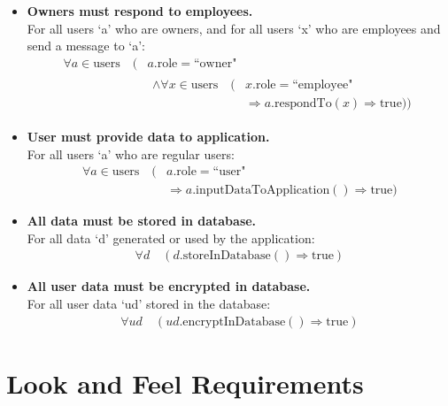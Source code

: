 \documentclass[12pt]{article}
\begin{document}
\begin{itemize}
    \item \textbf{Owners must respond to employees.}\\
    For all users `a' who are owners, and for all users `x' who are employees and send a message to `a':
    \[
    \begin{split}
        \forall a \in \text{users} \quad (& a.\text{role} = \text{``owner"} \\
        & \begin{split} 
            \land \forall x \in \text{users} \quad (& x.\text{role} = \text{``employee"}\\
            & \Rightarrow a.\text{respondTo}(x) \Rightarrow \text{true}))
        \end{split}
    \end{split}
    \]
    
    \item \textbf{User must provide data to application.}\\
    For all users `a' who are regular users:
    \[
    \begin{split}
        \forall a \in \text{users} \quad (& a.\text{role} = \text{``user"}\\
        & \Rightarrow a.\text{inputDataToApplication}() \Rightarrow \text{true})
    \end{split}
    \]

    \item \textbf{All data must be stored in database.}\\
    For all data `d' generated or used by the application:
    \[
    \begin{split}
        \forall d \quad (d.\text{storeInDatabase}() \Rightarrow \text{true})
    \end{split}
    \]
    
    \item \textbf{All user data must be encrypted in database.}\\
    For all user data `ud' stored in the database:
    \[
    \begin{split}
        \forall ud \quad (ud.\text{encryptInDatabase}() \Rightarrow \text{true})
    \end{split}
    \]
    
\end{itemize}

\section{Look and Feel Requirements}
\end{document}
